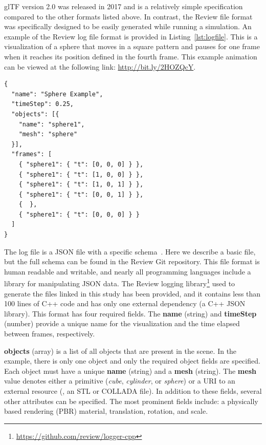 glTF version 2.0 was released in 2017 and is a relatively simple specification compared to the other formats listed above.
%
In contrast, the Review file format was specifically designed to be easily generated while running a simulation. An example of the Review log file format is provided in Listing~\ref{lst:logfile}.
%
This is a visualization of a sphere that moves in a square pattern and pauses for one frame when it reaches its position defined in the fourth frame.
%
This example animation can be viewed at the following link: \url{http://bit.ly/2HOZQcY}.


\begin{minipage}{\linewidth}
\begin{lstlisting}[style=json, caption={Review Log File Example}, label=lst:logfile]
{
  "name": "Sphere Example",
  "timeStep": 0.25,
  "objects": [{
    "name": "sphere1",
    "mesh": "sphere"
  }],
  "frames": [
    { "sphere1": { "t": [0, 0, 0] } },
    { "sphere1": { "t": [1, 0, 0] } },
    { "sphere1": { "t": [1, 0, 1] } },
    { "sphere1": { "t": [0, 0, 1] } },
    {  },
    { "sphere1": { "t": [0, 0, 0] } }
  ]
}
\end{lstlisting}
\end{minipage}


The log file is a JSON file with a specific schema~\autocite{JSON.2018.Schema}. Here we describe a basic file, but the full schema can be found in the Review Git repository.
%
This file format is human readable and writable, and nearly all programming languages include a library for manipulating JSON data.
%
The Review logging library\footnote{\url{https://github.com/review/logger-cpp}} used to generate the  files linked in this study has been provided, and it contains less than 100 lines of C++ code and has only one external dependency (a C++ JSON library).
%
This format has four required fields. The \textbf{name} (string) and \textbf{timeStep} (number) provide a unique name for the visualization and the time elapsed between frames, respectively.


\textbf{objects} (array) is a list of all objects that are present in the scene. In the example, there is only one object and only the required object fields are specified.
%
Each object must have a unique \textbf{name} (string) and a \textbf{mesh} (string).
%
The \textbf{mesh} value denotes either a primitive (\emph{cube}, \emph{cylinder}, or \emph{sphere}) or a URI to an external resource (\eg{}, an STL or COLLADA file).
%
In addition to these fields, several other attributes can be specified. The most prominent fields include: a physically based rendering (PBR) material, translation, rotation, and scale.


